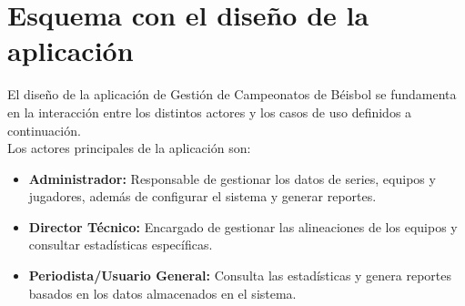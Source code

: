 \documentclass{report}
\begin{document}
    \section*{Esquema con el diseño de la aplicación}
    El diseño de la aplicación de Gestión de Campeonatos de Béisbol se fundamenta en la interacción 
    entre los distintos actores y los casos de uso definidos a continuación. \\ 

    Los actores principales de la aplicación son:
    \begin{itemize}
        \item \textbf{Administrador:} Responsable de gestionar los datos de series, equipos y jugadores, además de configurar el sistema y generar reportes.
        \item \textbf{Director Técnico:} Encargado de gestionar las alineaciones de los equipos y consultar estadísticas específicas.
        \item \textbf{Periodista/Usuario General:} Consulta las estadísticas y genera reportes basados en los datos almacenados en el sistema.
    \end{itemize}
\end{document}
